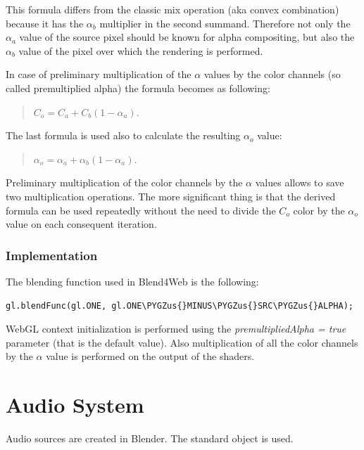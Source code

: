 \documentclass[a4paper,12pt,oneside]{sphinxmanual}
\def\PYGZus{\char`\_}
\begin{document}
This formula differs from the classic mix operation (aka convex combination) because it has the \(\alpha_b\) multiplier in the second summand. Therefore not only the \(\alpha_a\) value of the source pixel should be known for alpha compositing, but also the \(\alpha_b\) value of the pixel over which the rendering is performed.

In case of preliminary multiplication of the \(\alpha\) values by the color channels (so called premultiplied alpha) the formula becomes as following:
\begin{quote}

\(C_o = C_a + C_b (1 - \alpha_a)\).
\end{quote}

The last formula is used also to calculate the resulting \(\alpha_o\) value:
\begin{quote}

\(\alpha_o = \alpha_a + \alpha_b (1 - \alpha_a)\).
\end{quote}

Preliminary multiplication of the color channels by the \(\alpha\) values allows to save two multiplication operations. The more significant thing is that the derived formula can be used repeatedly without the need to divide the \(C_o\) color by the \(\alpha_o\) value on each consequent iteration.


\subsection{Implementation}
\label{gamma_alpha:id13}
The blending function used in Blend4Web is the following:

\begin{Verbatim}[commandchars=\\\{\}]
gl.blendFunc(gl.ONE, gl.ONE\PYGZus{}MINUS\PYGZus{}SRC\PYGZus{}ALPHA);
\end{Verbatim}

WebGL context initialization is performed using the \emph{premultipliedAlpha = true} parameter (that is the default value). Also multiplication of all the color channels by the \(\alpha\) value is performed on the output of the shaders.


\chapter{Audio System}
\label{audio:audio}\label{audio::doc}\label{audio:id1}
Audio sources are created in Blender. The standard  object is used.
\end{document}
